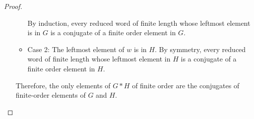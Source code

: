 \documentclass[12pt, psamsfonts]{amsart}
\theoremstyle{definition}
\theoremstyle{remark}
\numberwithin{equation}{section}
\begin{document}
\begin{proof}
\begin{itemize}
\begin{itemize}
          By induction, every reduced word of finite length whose leftmost element is in $G$ is a conjugate of a finite order element in $G$.
        \item
          Case 2: The leftmost element of $w$ is in $H$.
          By symmetry, every reduced word of finite length whose leftmost element in $H$ is a conjugate of a finite order element in $H$.
      \end{itemize}

      Therefore, the only elements of $G * H$ of finite order are the conjugates of finite-order elements of $G$ and $H$.
  \end{itemize}
\end{proof}
\end{document}
